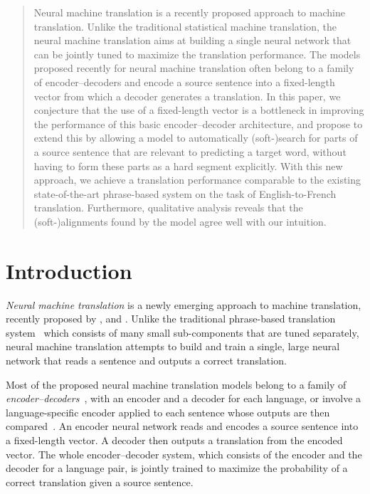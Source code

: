 \begin{abstract}
    Neural machine translation is a recently proposed approach to machine
    translation. Unlike the traditional statistical machine translation, the
    neural machine translation aims at building a single neural network that
    can be jointly tuned to maximize the translation performance. The models
    proposed recently for neural machine translation often belong to a family
    of encoder--decoders and encode a source sentence into a fixed-length
    vector from which a decoder generates a translation. In this paper, we
    conjecture that the use of a fixed-length vector is a bottleneck in
    improving the performance of this basic encoder--decoder architecture, and
    propose to extend this by allowing a model to automatically
    \mbox{(soft-)search} for parts of a source sentence that are relevant to
    predicting a target word, without having to form these parts as a hard
    segment explicitly. With this new approach, we achieve a translation
    performance comparable to the existing state-of-the-art phrase-based system
    on the task of English-to-French translation. Furthermore, qualitative
    analysis reveals that the \mbox{(soft-)alignments} found by the model agree
    well with our intuition.
\end{abstract}

\section{Introduction}

{\it Neural machine translation} is a newly emerging approach to machine
translation, recently proposed by \citet{Kalchbrenner2013},
\citet{Sutskever2014} and \citet{Cho2014a}. Unlike the traditional phrase-based
translation system~\citep[see, e.g.,][]{Koehn2003} which consists of many small
sub-components that are tuned separately, neural machine translation attempts
to build and train a single, large neural network that reads a sentence and
outputs a correct translation. 

Most of the proposed neural machine translation models belong to a family of
{\it encoder--decoders}~\citep{Sutskever2014,Cho2014}, with an encoder and a
decoder for each language, or involve a language-specific encoder applied to
each sentence whose outputs are then compared~\citep{Hermann2014}.  An encoder
neural network reads and encodes a source sentence into a fixed-length vector.
A decoder then outputs a translation from the encoded vector. The whole
encoder--decoder system, which consists of the encoder and the decoder for a
language pair, is jointly trained to maximize the probability of a correct
translation given a source sentence.

